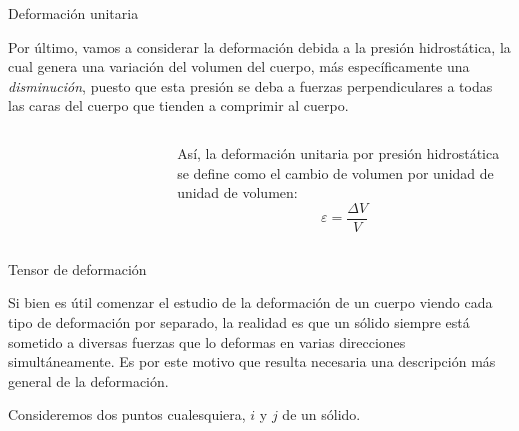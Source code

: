 \documentclass[11pt,handout,aspectratio=1610]{beamer}
\newcommand{\vs}{\vspace{11pt}}
\begin{document}
\begin{frame}{Deformación unitaria}

    Por último, vamos a considerar la deformación debida a la presión hidrostática, la cual genera una variación del volumen del cuerpo, más específicamente una \emph{disminución}, puesto que esta presión se deba a fuerzas perpendiculares a todas las caras del cuerpo que tienden a comprimir al cuerpo.

    \begin{columns}
        \begin{column}{0.5\textwidth}
            \begin{figure}
                \centering
                \begin{subfigure}{\textwidth}
                    \centering
                    \includegraphics{../figs/fluid_dynamics_pressure-2.pdf}
                \end{subfigure}
            \end{figure}
        \end{column}
        \begin{column}{0.5\textwidth}
            Así, la deformación unitaria por presión hidrostática se define como el cambio de volumen por unidad de unidad de volumen: $$ \varepsilon = \frac{\Delta V}{V} $$
        \end{column}
    \end{columns}

\end{frame}

\begin{frame}{Tensor de deformación}

    Si bien es útil comenzar el estudio de la deformación de un cuerpo viendo cada tipo de deformación por separado, la realidad es que un sólido siempre está sometido a diversas fuerzas que lo deformas en varias direcciones simultáneamente. Es por este motivo que resulta necesaria una descripción más general de la deformación.

    \vs 

    Consideremos dos puntos cualesquiera, $i$ y $j$ de un sólido.

    \begin{columns}
        \begin{column}{0.45\textwidth}
            
        \end{column}
        \begin{column}{0.45\textwidth}
            
        \end{column}
    \end{columns}

\end{frame}
\end{document}
